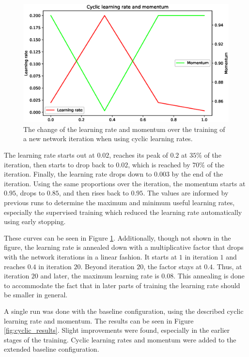 \documentclass[12pt,onecolumn,oneside,titlepage]{article}
\begin{document}
\begin{figure}[H]
\centering
\includegraphics[clip,width=\columnwidth]{cyclic}
\caption{The change of the learning rate and momentum over the training of a new network iteration when using cyclic learning rates.}
\label{fig:cyclic_lr}
\end{figure}

The learning rate starts out at $0.02$, reaches its peak of $0.2$ at $35\%$ of the iteration, 
then starts to drop back to $0.02$, which is reached by $70\%$ of the iteration. Finally, the learning rate drops down to $0.003$ by the end of the iteration.
Using the same proportions over the iteration, the momentum starts at $0.95$, drops to $0.85$, and then rises back to $0.95$.
The values are informed by previous runs to determine the maximum and minimum useful learning rates, especially the supervised training which reduced the learning rate automatically using early stopping.


These curves can be seen in Figure \ref{fig:cyclic_lr}.
Additionally, though not shown in the figure, the learning rate is annealed down with a multiplicative factor that drops with the network iterations in a linear fashion. 
It starts at $1$ in iteration $1$ and reaches $0.4$ in iteration $20$. Beyond iteration $20$, the factor stays at $0.4$.
Thus, at iteration $20$ and later, the maximum learning rate is $0.08$. This annealing is done to accommodate the fact that in later parts of training the learning rate should be smaller in general.


A single run was done with the baseline configuration, using the described cyclic learning rate and momentum. The results can be seen in Figure \ref{fig:cyclic_results}.
Slight improvements were found, especially in the earlier stages of the training. Cyclic learning rates and momentum were added to the extended baseline 
configuration. 
\end{document}
